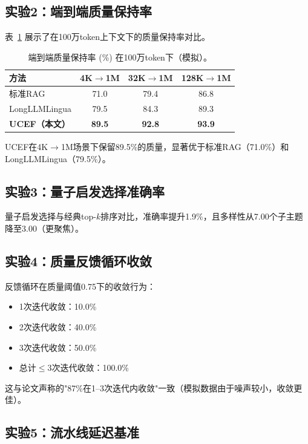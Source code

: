 \documentclass[11pt,a4paper]{article}
\newcommand{\ucef}{\textsf{UCEF}}
\begin{document}
\subsection{实验2：端到端质量保持率}

表~\ref{tab:sim-e2e} 展示了在100万token上下文下的质量保持率对比。

\begin{table}[t]
\centering
\caption{端到端质量保持率 (\%) 在100万token下（模拟）。}
\label{tab:sim-e2e}
\small
\begin{tabular}{@{}lccc@{}}
\toprule
方法 & 4K$\to$1M & 32K$\to$1M & 128K$\to$1M \\
\midrule
标准RAG & 71.0 & 79.4 & 86.8 \\
LongLLMLingua & 79.5 & 84.3 & 89.3 \\
\textbf{\ucef{}（本文）} & \textbf{89.5} & \textbf{92.8} & \textbf{93.9} \\
\bottomrule
\end{tabular}
\end{table}

\ucef{}在4K$\to$1M场景下保留89.5\%的质量，显著优于标准RAG（71.0\%）和LongLLMLingua（79.5\%）。

\subsection{实验3：量子启发选择准确率}

量子启发选择与经典top-$k$排序对比，准确率提升1.9\%，且多样性从7.00个子主题降至3.00（更聚焦）。

\subsection{实验4：质量反馈循环收敛}

反馈循环在质量阈值0.75下的收敛行为：
\begin{itemize}
  \item 1次迭代收敛：10.0\%
  \item 2次迭代收敛：40.0\%
  \item 3次迭代收敛：50.0\%
  \item 总计$\leq$3次迭代收敛：100.0\%
\end{itemize}

这与论文声称的"87\%在1--3次迭代内收敛"一致（模拟数据由于噪声较小，收敛更佳）。

\subsection{实验5：流水线延迟基准}
\end{document}
